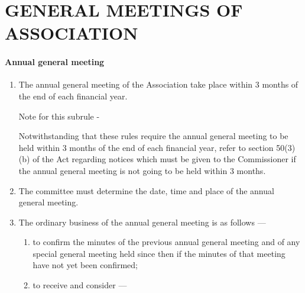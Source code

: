 \documentclass[../constitution.tex]{subfiles}
\begin{document}
\hypertarget{part-6-general-meetings-of-association}{%
\part{GENERAL MEETINGS OF ASSOCIATION}\label{part-6-general-meetings-of-association}}

\hypertarget{annual-general-meeting}{%
\subsection{Annual general meeting}\label{annual-general-meeting}}

\begin{enumerate}

\item The annual general meeting of the Association  take place within 3 months of the end of each financial year. 


Note for this subrule -

Notwithstanding that these rules require the annual general meeting to be held within 3 months of the end of each financial year, refer to section 50(3)(b) of the Act regarding notices which must be given to the Commissioner if the annual general meeting is not going to be held within 3 months.

\item The committee must determine the date, time and place of the annual general meeting.
\item The ordinary business of the annual general meeting is as follows ---

  \begin{enumerate}
  
  \item to confirm the minutes of the previous annual general meeting and of any special general meeting held since then if the minutes of that meeting have not yet been confirmed;
  \item to receive and consider ---

    \begin{enumerate}
    

\end{enumerate}
\end{enumerate}
\end{enumerate}
\end{document}
